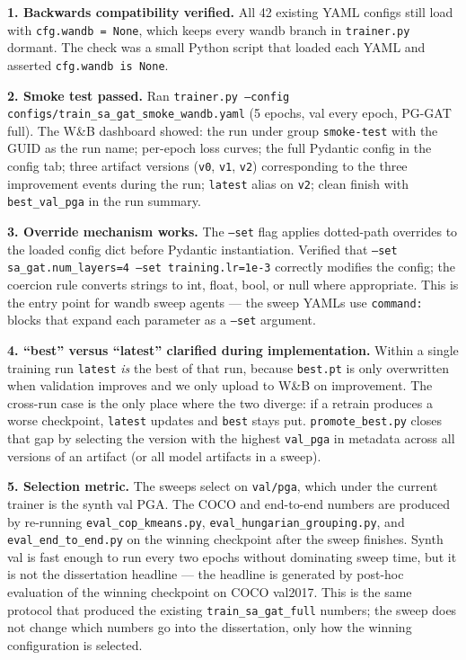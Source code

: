\textbf{1. Backwards compatibility verified.} All 42 existing YAML configs still load with \texttt{cfg.wandb = None}, which keeps every wandb branch in \texttt{trainer.py} dormant. The check was a small Python script that loaded each YAML and asserted \texttt{cfg.wandb is None}.

\textbf{2. Smoke test passed.} Ran \texttt{trainer.py --config configs/train\_sa\_gat\_smoke\_wandb.yaml} (5 epochs, val every epoch, PG-GAT full). The W\&B dashboard showed: the run under group \texttt{smoke-test} with the GUID as the run name; per-epoch loss curves; the full Pydantic config in the config tab; three artifact versions (\texttt{v0}, \texttt{v1}, \texttt{v2}) corresponding to the three improvement events during the run; \texttt{latest} alias on \texttt{v2}; clean finish with \texttt{best\_val\_pga} in the run summary.

\textbf{3. Override mechanism works.} The \texttt{--set} flag applies dotted-path overrides to the loaded config dict before Pydantic instantiation. Verified that \texttt{--set sa\_gat.num\_layers=4 --set training.lr=1e-3} correctly modifies the config; the coercion rule converts strings to int, float, bool, or null where appropriate. This is the entry point for wandb sweep agents --- the sweep YAMLs use \texttt{command:} blocks that expand each parameter as a \texttt{--set} argument.

\textbf{4. ``best'' versus ``latest'' clarified during implementation.} Within a single training run \texttt{latest} \emph{is} the best of that run, because \texttt{best.pt} is only overwritten when validation improves and we only upload to W\&B on improvement. The cross-run case is the only place where the two diverge: if a retrain produces a worse checkpoint, \texttt{latest} updates and \texttt{best} stays put. \texttt{promote\_best.py} closes that gap by selecting the version with the highest \texttt{val\_pga} in metadata across all versions of an artifact (or all model artifacts in a sweep).

\textbf{5. Selection metric.} The sweeps select on \texttt{val/pga}, which under the current trainer is the synth val PGA. The COCO and end-to-end numbers are produced by re-running \texttt{eval\_cop\_kmeans.py}, \texttt{eval\_hungarian\_grouping.py}, and \texttt{eval\_end\_to\_end.py} on the winning checkpoint after the sweep finishes. Synth val is fast enough to run every two epochs without dominating sweep time, but it is not the dissertation headline --- the headline is generated by post-hoc evaluation of the winning checkpoint on COCO val2017. This is the same protocol that produced the existing \texttt{train\_sa\_gat\_full} numbers; the sweep does not change which numbers go into the dissertation, only how the winning configuration is selected.

